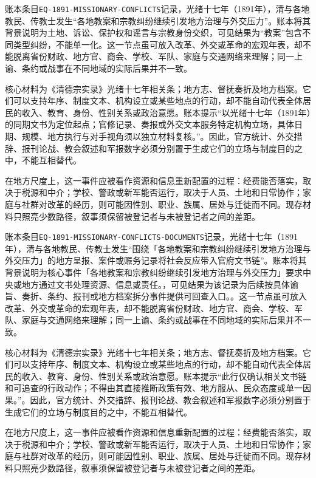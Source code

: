 账本条目\texttt{EQ-1891-MISSIONARY-CONFLICTS}记录，光绪十七年（1891年），清与各地教民、传教士发生“各地教案和宗教纠纷继续引发地方治理与外交压力”。账本将其背景说明为土地、诉讼、保护权和谣言与宗教身份交织，可见结果为“教案”包含不同类型纠纷，不能单一化。这一节点虽可放入改革、外交或革命的宏观年表，却不能脱离省份财政、地方官、商会、学校、军队、家庭与交通网络来理解；同一上谕、条约或战事在不同地域的实际后果并不一致。

核心材料为《清德宗实录》光绪十七年相关条；地方志、督抚奏折及地方档案。它们可以支持年序、制度文本、机构设立或某些地点的行动，却不能自动代表全体居民的收入、教育、身份、性别关系或政治意愿。账本提示“以光绪十七年（1891年）的同期文书为定位起点；官修记录、奏报或外交文本服务特定机构立场，具体日期、规模、地方执行与对手视角须以独立材料复核。”。因此，官方统计、外交措辞、报刊论战、教会叙述和军报数字必须分别置于生成它们的立场与制度目的之中，不能互相替代。

在地方尺度上，这一事件应被看作资源和信息重新配置的过程：经费能否落实，取决于税源和中介；学校、警政或新军能否运行，取决于人员、土地和日常协作；家庭与社群对改革的经历，则可能因性别、职业、族属、居处与迁徙而不同。现存材料只照亮少数路径，叙事须保留被登记者与未被登记者之间的差距。

账本条目\texttt{EQ-1891-MISSIONARY-CONFLICTS-DOCUMENTS}记录，光绪十七年（1891年），清与各地教民、传教士发生“围绕「各地教案和宗教纠纷继续引发地方治理与外交压力」的地方呈报、案件或赈务记录将社会反应带入官府文书链”。账本将其背景说明为核心事件「各地教案和宗教纠纷继续引发地方治理与外交压力」要求中央或地方通过文书处理资源、信息或责任。，可见结果为该记录为后续按具体谕旨、奏折、条约、报刊或地方档案拆分事件提供可回查入口。。这一节点虽可放入改革、外交或革命的宏观年表，却不能脱离省份财政、地方官、商会、学校、军队、家庭与交通网络来理解；同一上谕、条约或战事在不同地域的实际后果并不一致。

核心材料为《清德宗实录》光绪十七年相关条；地方志、督抚奏折及地方档案。它们可以支持年序、制度文本、机构设立或某些地点的行动，却不能自动代表全体居民的收入、教育、身份、性别关系或政治意愿。账本提示“此行仅确认相关文书链和可追查的行政动作；不得由其直接推断政策有效、地方服从、民众态度或单一因果。”。因此，官方统计、外交措辞、报刊论战、教会叙述和军报数字必须分别置于生成它们的立场与制度目的之中，不能互相替代。

在地方尺度上，这一事件应被看作资源和信息重新配置的过程：经费能否落实，取决于税源和中介；学校、警政或新军能否运行，取决于人员、土地和日常协作；家庭与社群对改革的经历，则可能因性别、职业、族属、居处与迁徙而不同。现存材料只照亮少数路径，叙事须保留被登记者与未被登记者之间的差距。

